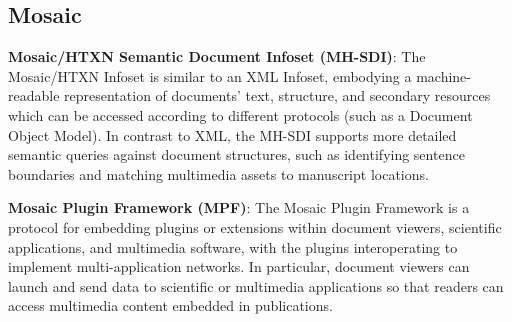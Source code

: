 \atsp
\begin{frame}{}
\section{Mosaic}

\vspace{-3pt}
{\thrulex}

{\fontsize{17}{22}\selectfont
\hspace*{13pt}\begin{minipage}{.97\textwidth}
\vspace{-6pt}



		

{\setlength{\leftmargini}{3pt}\begin{enumerate}
\vspace{11pt}
\dmitem \textbf{Mosaic/HTXN Semantic Document 
Infoset (MH-SDI)}:  \hspace{.25em} 
The Mosaic/HTXN Infoset is similar to an XML Infoset, 
embodying a machine-readable representation of documents' 
text, structure, and secondary resources which 
can be accessed according to different protocols 
(such as a Document Object Model).  In contrast to 
XML, the MH-SDI supports more detailed semantic 
queries against document structures, such as 
identifying sentence boundaries and matching 
multimedia assets to manuscript locations. 

\vspace{11pt}  
\dmitem \textbf{Mosaic Plugin Framework (MPF)}:  \hspace{.25em} 
The Mosaic Plugin Framework is a protocol for 
embedding plugins or extensions within document 
viewers, scientific applications, and multimedia 
software, with the plugins interoperating to implement 
multi-application networks.  In particular, 
document viewers can launch and send data to 
scientific or multimedia applications so 
that readers can access multimedia content 
embedded in publications.

\end{enumerate}
}

\end{minipage}
}


\end{frame}
